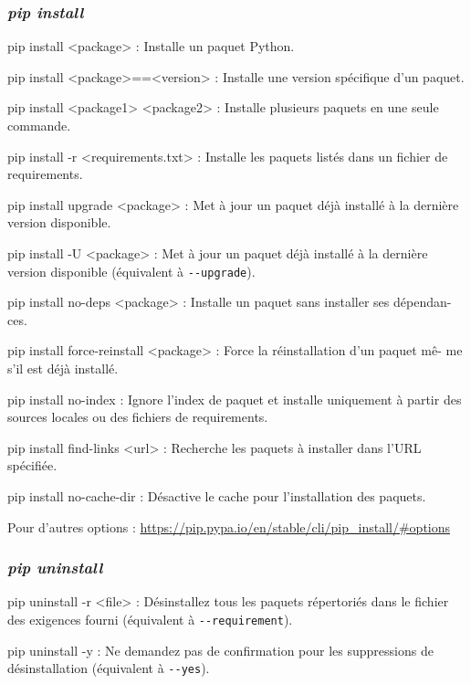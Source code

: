 \subsubsection*{\textit{pip install}}
\begin{optionlist}
\item[pip install <package> :] Installe un paquet Python.
\item[pip install <package>==<version> :] Installe une version spécifique d'un paquet.
\item[pip install <package1> <package2> :] Installe plusieurs paquets en une seule commande.
\item[pip install -r <requirements.txt> :] Installe les paquets listés dans un fichier de requirements.
\item[pip install \textendash\textendash upgrade <package> :] Met à jour un paquet déjà installé à la dernière version disponible.
\item[pip install -U <package> :] Met à jour un paquet déjà installé à la dernière version disponible (équivalent à \verb|--upgrade|).
\item[pip install \textendash\textendash no-deps <package> :] Installe un paquet sans installer ses dépendan- ces.
\item[pip install \textendash\textendash force-reinstall <package> :] Force la réinstallation d'un paquet mê- me s'il est déjà installé.
\item[pip install \textendash\textendash no-index :] Ignore l'index de paquet et installe uniquement à partir des sources locales ou des fichiers de requirements.
\item[pip install \textendash\textendash find-links <url> :] Recherche les paquets à installer dans l'URL spécifiée.
\item[pip install \textendash\textendash no-cache-dir :] Désactive le cache pour l'installation des paquets.
\end{optionlist}

Pour d'autres options : \url{https://pip.pypa.io/en/stable/cli/pip_install/\#options}

\subsubsection*{\textit{pip uninstall}}
\begin{optionlist}
\item[pip uninstall -r <file> :] Désinstallez tous les paquets répertoriés dans le fichier des exigences fourni (équivalent à \verb|--requirement|).
\item[pip uninstall -y :] Ne demandez pas de confirmation pour les suppressions de désinstallation (équivalent à \verb|--yes|).
\end{optionlist}

